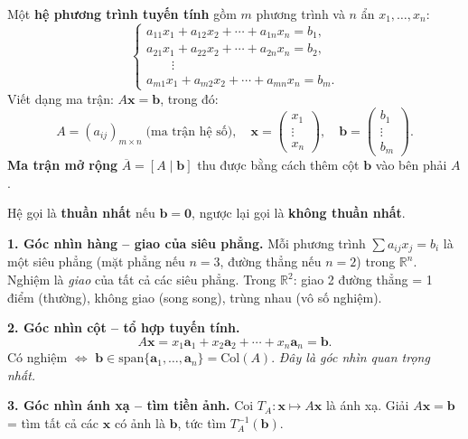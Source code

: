 \documentclass[12pt,a4paper]{article}
\begin{document}
\begin{dinhnghia}
  Một \textbf{hệ phương trình tuyến tính} gồm $m$ phương trình và $n$ ẩn $x_1, \ldots, x_n$:
  \[
    \begin{cases}
      a_{11}x_1 + a_{12}x_2 + \cdots + a_{1n}x_n = b_1, \\
      a_{21}x_1 + a_{22}x_2 + \cdots + a_{2n}x_n = b_2, \\
      \qquad\vdots \\
      a_{m1}x_1 + a_{m2}x_2 + \cdots + a_{mn}x_n = b_m.
    \end{cases}
  \]
  Viết dạng ma trận: $A\mathbf{x} = \mathbf{b}$, trong đó:
  \[
    A = (a_{ij})_{m\times n}\;\text{(ma trận hệ số)},\quad
    \mathbf{x} = \begin{pmatrix}x_1\\ \vdots \\ x_n\end{pmatrix}, \quad
    \mathbf{b} = \begin{pmatrix}b_1\\ \vdots\\ b_m\end{pmatrix}.
  \]
  \textbf{Ma trận mở rộng} $\overline{A} = [A \mid \mathbf{b}]$ thu được bằng cách thêm cột $\mathbf{b}$ vào bên phải $A$.

  Hệ gọi là \textbf{thuần nhất} nếu $\mathbf{b} = \mathbf{0}$, ngược lại gọi là \textbf{không thuần nhất}.
\end{dinhnghia}

\begin{ynghia}[title={Ba góc nhìn về $A\mathbf{x} = \mathbf{b}$}]
\textbf{1. Góc nhìn hàng -- giao của siêu phẳng.} Mỗi phương trình $\sum a_{ij} x_j = b_i$ là một siêu phẳng (mặt phẳng nếu $n=3$, đường thẳng nếu $n=2$) trong $\mathbb{R}^n$. Nghiệm là \emph{giao} của tất cả các siêu phẳng. Trong $\mathbb{R}^2$: giao 2 đường thẳng = 1 điểm (thường), không giao (song song), trùng nhau (vô số nghiệm).

\medskip
\textbf{2. Góc nhìn cột -- tổ hợp tuyến tính.}
\[
  A\mathbf{x} = x_1 \mathbf{a}_1 + x_2 \mathbf{a}_2 + \cdots + x_n \mathbf{a}_n = \mathbf{b}.
\]
Có nghiệm $\Leftrightarrow$ $\mathbf{b} \in \mathrm{span}\{\mathbf{a}_1, \ldots, \mathbf{a}_n\} = \mathrm{Col}(A)$. \emph{Đây là góc nhìn quan trọng nhất.}

\medskip
\textbf{3. Góc nhìn ánh xạ -- tìm tiền ảnh.} Coi $T_A: \mathbf{x} \mapsto A\mathbf{x}$ là ánh xạ. Giải $A\mathbf{x} = \mathbf{b}$ = tìm tất cả các $\mathbf{x}$ có ảnh là $\mathbf{b}$, tức tìm $T_A^{-1}(\mathbf{b})$.
\end{ynghia}
\end{document}
